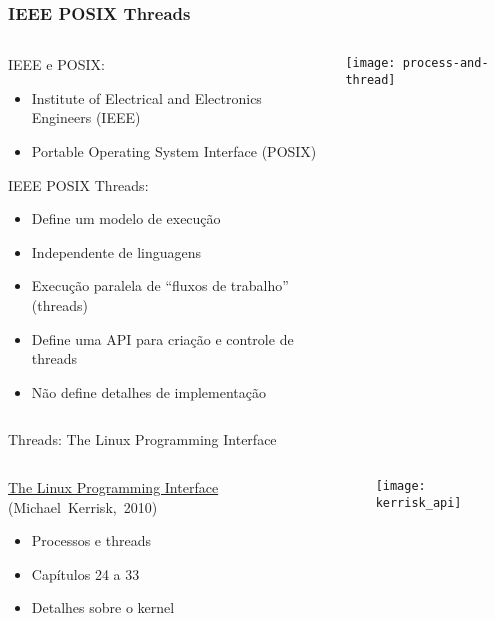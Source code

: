 \documentclass[10pt, compress, aspectratio=169, xcolor={table,usenames,dvipsnames}]{beamer}
\begin{document}
\begin{frame}
  \frametitle{IEEE POSIX Threads}

  \begin{columns}
    \begin{column}{0.5\columnwidth}

      \alert{IEEE} e \alert{POSIX}:
      \begin{itemize}
      \item Institute of Electrical and Electronics Engineers (\alert{IEEE})
      \item Portable Operating System Interface (\alert{POSIX})
      \end{itemize}

      \alert{IEEE POSIX Threads}:
      \begin{itemize}
      \item Define um \alert{modelo de execução}
      \item \alert{Independente} de linguagens
      \item Execução paralela de ``\alert{fluxos de trabalho}'' (\alert{threads})
      \item Define uma API para \alert{criação e controle} de threads
      \item \alert{Não define} detalhes de implementação
      \end{itemize}
    \end{column}
    \begin{column}{0.5\columnwidth}
      \begin{center}
        \texttt{[image: process-and-thread]}
      \end{center}
    \end{column}
  \end{columns}
\end{frame}

\begin{frame}{Threads: The Linux Programming Interface}
  \begin{columns}
    \begin{column}{0.5\columnwidth}
      \href{https://man7.org/tlpi}{The Linux Programming Interface}
      \mbox{(Michael Kerrisk, 2010)}

      \begin{itemize}
      \item Processos e threads
      \item Capítulos 24 a 33
      \item Detalhes sobre o kernel
      \end{itemize}
    \end{column}
    \begin{column}{0.5\columnwidth}
      \begin{center}
        \texttt{[image: kerrisk\_api]}
      \end{center}
    \end{column}
  \end{columns}
\end{frame}
\end{document}
